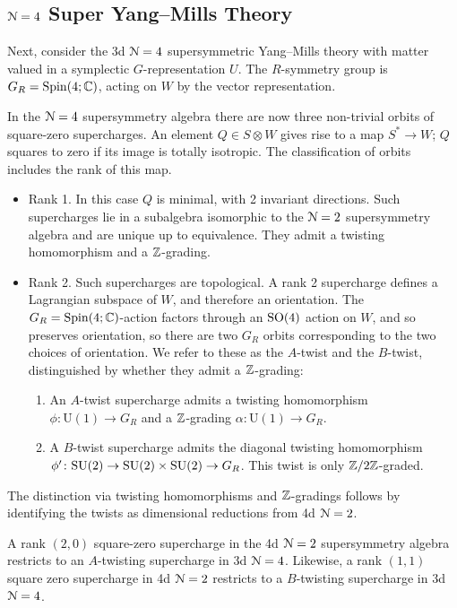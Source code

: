 \documentclass[10pt, oneside]{article}
\renewcommand{\U}{\mathrm{U}}
\begin{document}
\subsection{\texorpdfstring{$\mathcal N = 4$}{N=4} Super Yang--Mills Theory} \label{3d_4_section}
Next, consider the 3d $\mathcal{N}=4$ supersymmetric Yang--Mills theory with matter valued in a symplectic $G$-representation $U$. The $R$-symmetry group is $G_R = \mathrm{Spin}(4;\mathbb C)$, acting on $W$ by the vector representation.

In the $\mathcal{N}=4$ supersymmetry algebra there are now three non-trivial orbits of square-zero supercharges.  An element $Q \in S \otimes W$ gives rise to a map $S^* \to W$; $Q$ squares to zero if its image is totally isotropic.  The classification of orbits includes the rank of this map.
\begin{itemize}
 \item Rank 1.  
 In this case $Q$ is minimal, with 2 invariant directions.  
 Such supercharges lie in a subalgebra isomorphic to the $\mathcal{N}=2$ supersymmetry algebra and are unique up to equivalence. They admit a twisting homomorphism and a $\mathbb Z$-grading.
 \item Rank 2. Such supercharges are topological.  
A rank 2 supercharge defines a Lagrangian subspace of $W$, and therefore an orientation.  
The $G_R = \mathrm{Spin}(4;\mathbb C)$-action factors through an $\mathrm{SO}(4)$ action on $W$, and so preserves orientation, so there are two $G_R$ orbits corresponding to the two choices of orientation. We refer to these as the $A$-twist and the $B$-twist, distinguished by whether they admit a $\mathbb Z$-grading:
\begin{enumerate}
\item
An $A$-twist supercharge admits a twisting homomorphism $\phi \colon \U(1) \to G_R$ and a $\mathbb Z$-grading $\alpha \colon \U(1) \to G_R$.
\item
A $B$-twist supercharge admits the diagonal twisting homomorphism $\phi' \colon \mathrm{SU}(2) \to \mathrm{SU}(2) \times \mathrm{SU}(2) \to G_R$.  
This twist is only $\mathbb Z/2\mathbb Z$-graded.
\end{enumerate}
\end{itemize}

The distinction via twisting homomorphisms and $\mathbb Z$-gradings follows by identifying the twists as dimensional reductions from 4d $\mathcal{N}=2$.
 
\begin{lemma} \label{3d_4_orbits_lemma}
A rank $(2,0)$ square-zero supercharge in the 4d $\mathcal{N}=2$ supersymmetry algebra restricts to an $A$-twisting supercharge in 3d $\mathcal{N}=4$.  Likewise, a rank $(1,1)$ square zero supercharge in 4d $\mathcal{N}=2$ restricts to a $B$-twisting supercharge in 3d $\mathcal{N}=4$.
\end{lemma}
\end{document}
